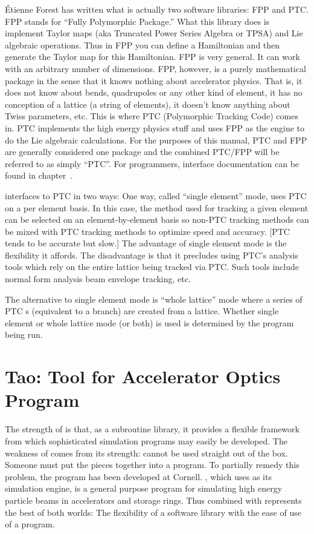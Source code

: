 \'Etienne Forest\cite{b:forest} has written what is actually two
software libraries: FPP and PTC.  FPP stands for ``Fully Polymorphic
Package.'' What this library does is implement Taylor maps (aka
Truncated Power Series Algebra or TPSA) and Lie algebraic
operations. Thus in FPP you can define a Hamiltonian and then generate
the Taylor map for this Hamiltonian. FPP is very general. It can work
with an arbitrary number of dimensions.  FPP, however, is a purely
mathematical package in the sense that it knows nothing about
accelerator physics. That is, it does not know about bends,
quadrupoles or any other kind of element, it has no conception of a
lattice (a string of elements), it doesn't know anything about Twiss
parameters, etc. This is where PTC (Polymorphic Tracking Code) comes
in. PTC implements the high energy physics stuff and uses FPP as
the engine to do the Lie algebraic calculations.  For the purposes of
this manual, PTC and FPP are generally considered one package and the
combined PTC/FPP will be referred to as simply ``PTC''.
For programmers, interface documentation can be found in
chapter~.

\bmad interfaces to PTC in two ways: One way, called ``single
element'' mode, uses PTC on a per element basis. In this case, the
method used for tracking a given element can be selected on an
element-by-element basis so non-PTC tracking methods can be mixed with
PTC tracking methods to optimize speed and accuracy. [PTC tends to be
accurate but slow.] The advantage of single element mode is the
flexibility it affords. The disadvantage is that it precludes using
PTC's analysis tools which rely on the entire lattice being tracked
via PTC. Such tools include normal form analysis beam envelope
tracking, etc.

The alternative to single element mode is ``whole lattice'' mode where
a series of PTC s (equivalent to a \bmad branch) are
created from a \bmad lattice. Whether single element or whole lattice
mode (or both) is used is determined by the program being run.

\section{Tao: Tool for Accelerator Optics Program}
\label{s:tao.intro}
The strength of \bmad is that, as a subroutine library, it provides a
flexible framework from which sophisticated simulation programs may
easily be developed.  The weakness of \bmad comes from its strength:
\bmad cannot be used straight out of the box. Someone must put the
pieces together into a program. To partially remedy this problem, the
\tao program\cite{b:tao} has been developed at Cornell. \tao, which uses
\bmad as its simulation engine, is a general purpose program for
simulating high energy particle beams in accelerators and storage rings.
Thus \bmad combined with \tao represents the best of both worlds: The
flexibility of a software library with the ease of use of a program.

